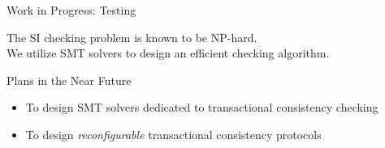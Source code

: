 
\begin{frame}{Work in Progress: Testing}
  \begin{center}

    \vspace{0.50cm}
    The SI checking problem is known to be \textsf{NP-hard}.  \\[10pt]
    We utilize SMT solvers to design an efficient checking algorithm.
  \end{center}
\end{frame}

\begin{frame}{Plans in the Near Future}
  \begin{itemize}
    \setlength{\itemsep}{8pt}
    \item To design SMT solvers dedicated to transactional consistency checking
    \item To design \emph{reconfigurable} transactional consistency protocols
  \end{itemize}
\end{frame}
